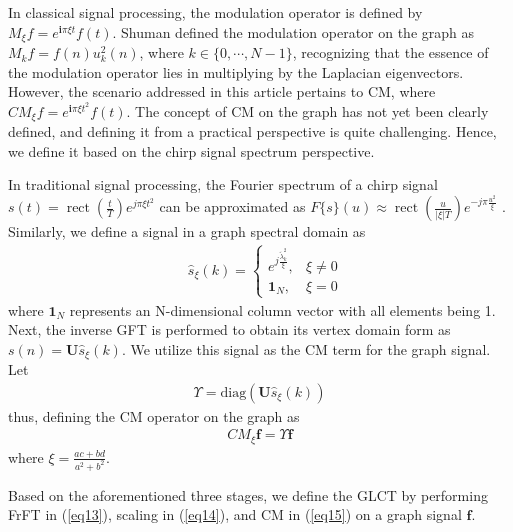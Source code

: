 \documentclass[lettersize,journal]{IEEEtran}
\begin{document}
\begin{description}
	In classical signal processing, the modulation operator is defined by $M_{\xi}f=e^{\mathbf{i}\pi \xi t}f(t)$. Shuman defined the modulation operator on the graph as $M_{k}f={f(n)} {u}_{k}^2(n)$, where $k \in \{0,\cdots,N-1\}$, recognizing that the essence of the modulation operator lies in multiplying by the Laplacian eigenvectors. \\
	However, the scenario addressed in this article pertains to CM, where $CM_{\xi}f=e^{\mathbf{i}\pi \xi t^2}f(t)$. The concept of CM on the graph has not yet been clearly defined, and defining it from a practical perspective is quite challenging. Hence, we define it based on the chirp signal spectrum perspective.
	
	In traditional signal processing, the Fourier spectrum of a chirp signal $s(t)=\operatorname{rect}\left(\frac{t}{T}\right) e^{j \pi \xi t^2}$ can be approximated as $F\{s\}(u) \approx \operatorname{rect}\left(\frac{u}{|\xi| T}\right) e^{-j \pi \frac{u^2}{\xi}}$ \cite{cumming2005digital}. 
	Similarly, we define a signal in a graph spectral domain as 
	\begin{align}
		&\hat{s}_{\xi}(k)= 
		\left \{
		\begin{array}{ll}
			e^{j \frac{\widetilde{\lambda}_k^2}{\xi}},                    & \xi \ne 0\\
			\mathbf{1}_N,    & \xi=0
		\end{array}
		\right.
	\end{align}
	where $\mathbf{1}_N$ represents an N-dimensional column vector with all elements being 1. 
	Next, the inverse GFT is performed to obtain its vertex domain form as $s(n) = \mathbf{U} \hat{s}_{\xi}(k)$.
	We utilize this signal as the CM term for the graph signal. Let 
	\begin{align}
		\Upsilon = \mathrm{diag} \left(\mathbf{U} \hat{s}_{\xi}(k)\right)
	\end{align}
	thus, defining the CM operator on the graph as 
	\begin{align} \label{eq15}
		CM_{\xi}\mathbf{f}= \Upsilon\mathbf{f}
	\end{align}
	where $\xi=\frac{a c+b d}{a^2+b^2}$.
\end{description}

Based on the aforementioned three stages, we define the GLCT by performing FrFT in (\ref{eq13}), scaling in (\ref{eq14}), and CM in (\ref{eq15}) on a graph signal $\mathbf{f}$.
\end{document}

